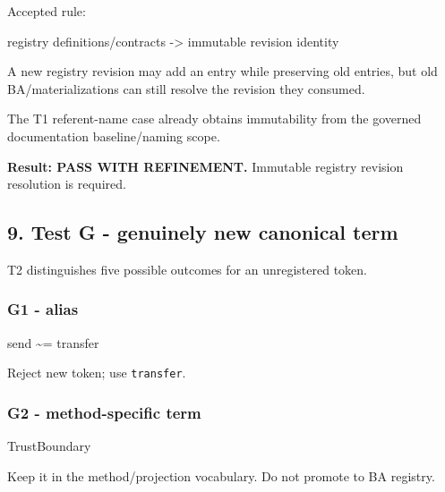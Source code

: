 \documentclass[
  10pt,
  a4paper,
]{article}
\newenvironment{Shaded}{}{}
\newcommand{\NormalTok}[1]{#1}
\begin{document}
Accepted rule:

\begin{Shaded}
\begin{Highlighting}[]
\NormalTok{registry definitions/contracts}
\NormalTok{  {-}\textgreater{} immutable revision identity}
\end{Highlighting}
\end{Shaded}

A new registry revision may add an entry while preserving old entries,
but old BA/materializations can still resolve the revision they
consumed.

The T1 referent-name case already obtains immutability from the governed
documentation baseline/naming scope.

\textbf{Result: PASS WITH REFINEMENT.} Immutable registry revision
resolution is required.

\subsection{9. Test G - genuinely new canonical
term}\label{test-g---genuinely-new-canonical-term}

T2 distinguishes five possible outcomes for an unregistered token.

\subsubsection{G1 - alias}\label{g1---alias}

\begin{Shaded}
\begin{Highlighting}[]
\NormalTok{send \textasciitilde{}= transfer}
\end{Highlighting}
\end{Shaded}

Reject new token; use \texttt{transfer}.

\subsubsection{G2 - method-specific
term}\label{g2---method-specific-term}

\begin{Shaded}
\begin{Highlighting}[]
\NormalTok{TrustBoundary}
\end{Highlighting}
\end{Shaded}

Keep it in the method/projection vocabulary. Do not promote to BA
registry.
\end{document}
